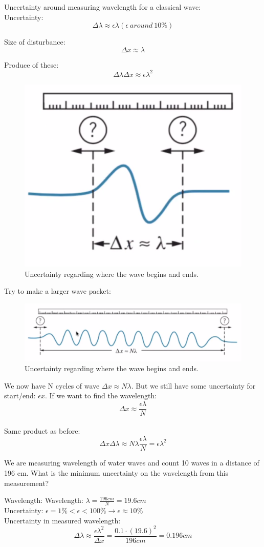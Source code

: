 \documentclass[class=article,crop=false]{standalone}
\begin{document}
Uncertainty around measuring wavelength for a classical wave:\\

Uncertainty:
$$ \Delta \lambda \approx \epsilon\lambda (\epsilon\ around\ 10\%) $$

Size of disturbance:
$$ \Delta x \approx \lambda $$

Produce of these:
$$ \Delta \lambda \Delta x \approx \epsilon \lambda^2 $$


\begin{figure}[h!]
	\centering
	\includegraphics[width=.4\linewidth]{./Images/wave2.png}
	\caption{Uncertainty regarding where the wave begins and ends.}
\end{figure}


Try to make a larger wave packet:

\begin{figure}[h!]
	\centering
	\includegraphics[width=.7\linewidth]{./Images/wave3.png}
	\caption{Uncertainty regarding where the wave begins and ends.}
\end{figure}
We now have N cycles of wave $\Delta x \approx N\lambda$. But we still have some uncertainty for start/end: $\epsilon x$. If we want to find the wavelength: $$\Delta x \approx \frac{\epsilon\lambda}{N}$$\\

Same product as before:
$$ \Delta x \Delta \lambda \approx N\lambda \frac{\epsilon \lambda}{N} = \epsilon \lambda^2 $$

\newpage
\begin{question}
	We are measuring wavelength of water waves and count 10 waves in a distance of 196 cm. What is the minimum uncertainty on the wavelength from this measurement?
	\begin{answer}[Answer]
		Wavelength:
		Wavelength: $ \lambda = \frac{196 cm}{N} = 19.6 cm $\\
		Uncertainty: $\epsilon = 1\% < \epsilon < 100\% \rightarrow \epsilon \approx 10\%$\\
		Uncertainty in measured wavelength:
		$$ \Delta \lambda \approx \frac{\epsilon \lambda^2}{\Delta x} = \frac{0.1 \cdot (19.6)^2}{196 cm} = 0.196 cm $$

	\end{answer}
\end{question}
\end{document}
